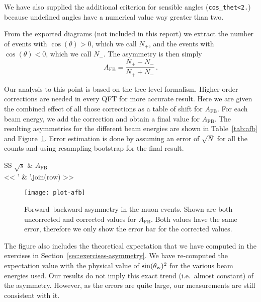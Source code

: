 \documentclass[11pt, english, fleqn, DIV=15, headinclude, BCOR=2cm]{scrreprt}
\begin{document}
We have also supplied the additional criterion for sensible angles
(\texttt{cos\_thet<2.}) because undefined angles have a numerical value way
greater than two.

From the exported diagrams (not included in this report) we extract the number
of events with $\cos(\theta) > 0$, which we call $N_+$, and the events with
$\cos(\theta) < 0$, which we call $N_-$. The asymmetry is then simply
\[
    A_\text{FB} = \frac{N_+ - N_-}{N_+ + N_-} \,.
\]

Our analysis to this point is based on the tree level formalism. Higher order
corrections are needed in every QFT for more accurate result. Here we are given
the combined effect of all those corrections as a table of shift for
$A_\text{FB}$. For each beam energy, we add the correction and obtain a final
value for $A_\text{FB}$. The resulting asymmetries for the different beam
energies are shown in  Table~\ref{tab:afb} and Figure~\ref{fig:plot-afb}. Error
estimation is done by assuming an error of $\sqrt{N}$ for all the counts and
using resampling bootstrap for the final result.

\begin{table}
    \centering
    \begin{tabular}{SS}
        \toprule
        {$\sqrt s$} & {$A_\mathrm{FB}$} \\
        \midrule
        << ' & '.join(row) >> \\
        \bottomrule
    \end{tabular}
    \caption{%
        Forward--backward asymmetry in the muon events.
    }
    \label{tab:afb}
\end{table}

\begin{figure}
    \centering
    \texttt{[image: plot-afb]}
    \caption{%
        Forward--backward asymmetry in the muon events. Shown are both
        uncorrected and corrected values for $A_\text{FB}$. Both values have
        the same error, therefore we only show the error bar for the corrected
        values.
    }
    \label{fig:plot-afb}
\end{figure}

The figure also includes the theoretical expectation that we have computed in
the exercises in Section~\ref{sec:exercises-asymmetry}. We have re-computed the
expectation value with the physical value of $\sin(\theta_\text w)^2$ for the
various beam energies used. Our results do not imply this exact trend (i.e.\
almost constant) of the asymmetry. However, as the errors are quite large, our
measurements are still consistent with it.
\end{document}
